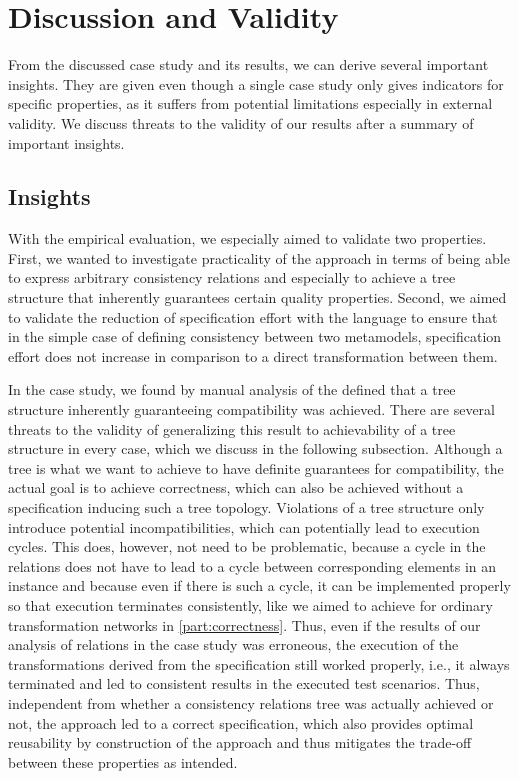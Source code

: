 \section{Discussion and Validity}

From the discussed case study and its results, we can derive several important insights.
They are given even though a single case study only gives indicators for specific properties, as it suffers from potential limitations especially in external validity.
We discuss threats to the validity of our results after a summary of important insights.

\subsection*{Insights}

With the empirical evaluation, we especially aimed to validate two properties.
First, we wanted to investigate practicality of the \commonalities approach in terms of being able to express arbitrary consistency relations and especially to achieve a tree structure that inherently guarantees certain quality properties.
Second, we aimed to validate the reduction of specification effort with the \commonalities language to ensure that in the simple case of defining consistency between two metamodels, specification effort does not increase in comparison to a direct transformation between them.

In the case study, we found by manual analysis of the defined \commonalities that a tree structure inherently guaranteeing compatibility was achieved.
There are several threats to the validity of generalizing this result to achievability of a tree structure in every case, which we discuss in the following subsection.
Although a tree is what we want to achieve to have definite guarantees for compatibility, the actual goal is to achieve correctness, which can also be achieved without a specification inducing such a tree topology.
Violations of a tree structure only introduce potential incompatibilities, which can potentially lead to execution cycles.
This does, however, not need to be problematic, because a cycle in the relations does not have to lead to a cycle between corresponding elements in an instance and because even if there is such a cycle, it can be implemented properly so that execution terminates consistently, like we aimed to achieve for ordinary transformation networks in \autoref{part:correctness}.
Thus, even if the results of our analysis of relations in the case study was erroneous, the execution of the transformations derived from the \commonalities specification still worked properly, i.e., it always terminated and led to consistent results in the executed test scenarios.
Thus, independent from whether a consistency relations tree was actually achieved or not, the approach led to a correct specification, which also provides optimal reusability by construction of the \commonalities approach and thus mitigates the trade-off between these properties as intended.

